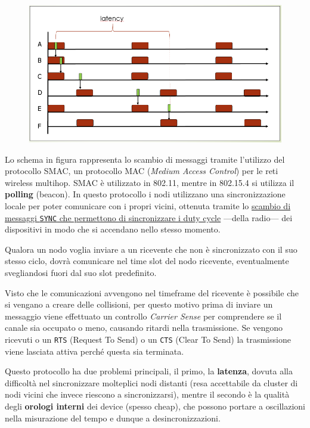 \begin{figure}[htbp]
   \centering
   \includegraphics{images/questions/Schermata del 2023-10-20 11-35-40.png}
   \label{fig:dom17}
\end{figure}

Lo schema in figura rappresenta lo scambio di messaggi tramite l'utilizzo del protocollo SMAC, un protocollo MAC (\textit{Medium Access Control}) per le reti wireless multihop.
SMAC è utilizzato in 802.11, mentre in 802.15.4 si utilizza il \textbf{polling} (beacon).
In questo protocollo i nodi utilizzano una sincronizzazione locale per poter comunicare con i propri vicini, ottenuta tramite lo \ul{scambio di messaggi \texttt{SYNC} che permettono di sincronizzare i duty cycle} ---della radio--- dei dispositivi in modo che si accendano nello stesso momento.

Qualora un nodo voglia inviare a un ricevente che non è sincronizzato con il suo stesso ciclo, dovrà comunicare nel time slot del nodo ricevente, eventualmente svegliandosi fuori dal suo slot predefinito.

Visto che le comunicazioni avvengono nel timeframe del ricevente è possibile che si vengano a creare delle collisioni, per questo motivo prima di inviare un messaggio viene effettuato un controllo \textit{Carrier Sense} per comprendere se il canale sia occupato o meno, causando ritardi nella trasmissione. Se vengono ricevuti o un \texttt{RTS} (Request To Send) o un \texttt{CTS} (Clear To Send) la trasmissione viene lasciata attiva perché questa sia terminata.

Questo protocollo ha due problemi principali, il primo, la \textbf{latenza}, dovuta alla difficoltà nel sincronizzare molteplici nodi distanti (resa accettabile da cluster di nodi vicini che invece riescono a sincronizzarsi), mentre il secondo è la qualità degli \textbf{orologi interni} dei device (spesso cheap), che possono portare a oscillazioni nella misurazione del tempo e dunque a desincronizzazioni.

